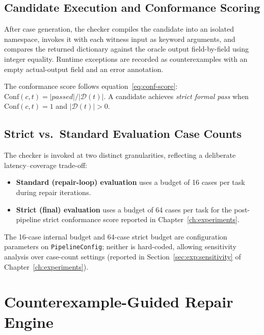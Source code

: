 \subsection{Candidate Execution and Conformance Scoring}

After case generation, the checker compiles the candidate into an isolated
namespace, invokes it with each witness input as keyword arguments, and
compares the returned dictionary against the oracle output field-by-field
using integer equality.  Runtime exceptions are recorded as counterexamples
with an empty actual-output field and an error annotation.

The conformance score follows equation~\eqref{eq:conf-score}:
$\mathrm{Conf}(c,t) = |\mathit{passed}| / |\mathcal{D}(t)|$.
A candidate achieves \emph{strict formal pass} when
$\mathrm{Conf}(c,t) = 1$ and $|\mathcal{D}(t)| > 0$.

\subsection{Strict vs.\ Standard Evaluation Case Counts}

The checker is invoked at two distinct granularities, reflecting a deliberate
latency--coverage trade-off:

\begin{itemize}
  \item \textbf{Standard (repair-loop) evaluation} uses a budget of
        16 cases per task during repair iterations.
  \item \textbf{Strict (final) evaluation} uses a budget of
        64 cases per task for the post-pipeline strict conformance score
        reported in Chapter~\ref{ch:experiments}.
\end{itemize}

The 16-case internal budget and 64-case strict budget are configuration
parameters on \texttt{PipelineConfig}; neither is hard-coded, allowing
sensitivity analysis over case-count settings (reported in
Section~\ref{sec:exp:sensitivity} of Chapter~\ref{ch:experiments}).

\section{Counterexample-Guided Repair Engine}
\label{sec:impl:repair}


